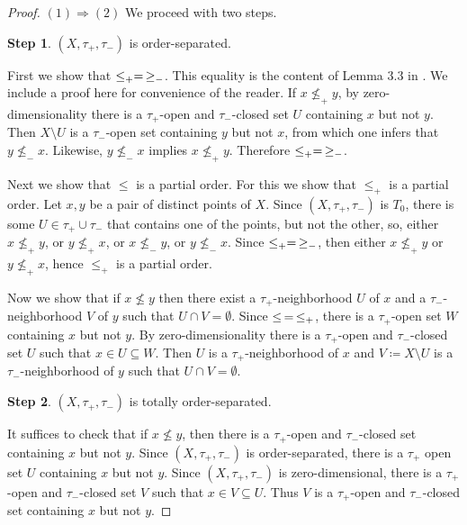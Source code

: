 \documentclass[11pt]{article}
\theoremstyle{plain}
\theoremstyle{definition}
\begin{document}
\begin{proof}
$(1)\Rightarrow(2)$ We proceed with two steps.

{\bf Step 1}.   $(X,\tau_+,\tau_-)$ is order-separated. 

First  we show that $\leq_+  =\thinspace \geq_-$. This equality is the content of Lemma 3.3 in \cite{BBGK}. We include a proof here for convenience of the reader. If $x\not\leq_+y$,  by zero-dimensionality there is a $\tau_+$-open  and $\tau_-$-closed set $U$ containing $x$ but not $y$. Then $X\setminus U$ is a $\tau_-$-open set containing $y$ but not $x$, from which one infers that $y\not\leq_- x$. Likewise, $y\not\leq_-x$ implies  $x\not\leq_+y$. Therefore $\leq_+  =\thinspace  \geq_-$. 

Next we show that $\leq$ is a partial order. For this we show that  $\leq_+$ is a partial order. Let $x,y$ be a pair of distinct points of $X$. Since   $(X,\tau_{+}, \tau_{-})$ is $T_0$, there is some $U\in\tau_+\cup\tau_-$ that contains one of the points, but not the other, so, either $x\not\leq_+ y$, or  $y\not\leq_+ x$, or  $x\not\leq_- y$, or  $y\not\leq_- x$. Since $\leq_+  =\thinspace \geq_-$, then either $x\not\leq_+ y$ or  $y\not\leq_+ x$, hence $\leq_+$ is a partial order.

Now we show that if $x\not\leq y$ then there exist a $\tau_+$-neighborhood $U$ of $x$ and a $\tau_-$-neighborhood $V$ of $y$ such that  $U\cap V=\emptyset$.  Since $\leq\thinspace =\thinspace \leq_+$,  there is a $\tau_+$-open set $W$ containing $x$ but not $y$. By zero-dimensionality there is a $\tau_+$-open  and $\tau_-$-closed set $U$ such that $x\in U\subseteq W$. Then $U$ is a $\tau_+$-neighborhood  of $x$  and $V\coloneqq X\setminus U$ is a $\tau_-$-neighborhood of $y$ such that  $U\cap V=\emptyset$.

{\bf Step 2}.  $(X,\tau_+,\tau_-)$ is totally order-separated. 

It suffices to check that if $x\not\leq y$, then there is a $\tau_+$-open  and $\tau_-$-closed set containing $x$ but not $y$.  Since $(X,\tau_+,\tau_-)$ is order-separated, there is a $\tau_+$
open set $U$ containing $x$ but not $y$. Since $(X,\tau_+,\tau_-)$ is zero-dimensional, there is a $\tau_+$-open  and $\tau_-$-closed set $V$ such that $x\in V\subseteq U$. Thus $V$ is a $\tau_+$-open  and $\tau_-$-closed set containing $x$ but not $y$. 
 

\end{proof}
\end{document}
